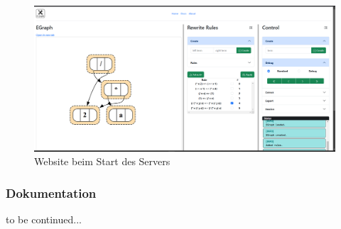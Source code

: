 \newpage
\begin{figure}[H]
\centering
\includegraphics[scale=0.42, angle=90]{../fig/website.png}
\caption{Website beim Start des Servers}
\label{fig:website}
\end{figure}
\newpage








\subsubsection{Dokumentation}

to be continued...






